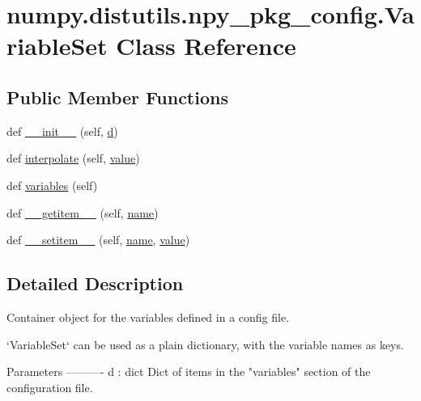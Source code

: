 \hypertarget{classnumpy_1_1distutils_1_1npy__pkg__config_1_1VariableSet}{}\section{numpy.\+distutils.\+npy\+\_\+pkg\+\_\+config.\+Variable\+Set Class Reference}
\label{classnumpy_1_1distutils_1_1npy__pkg__config_1_1VariableSet}
\subsection*{Public Member Functions}
\begin{DoxyCompactItemize}
\item 
def \hyperlink{classnumpy_1_1distutils_1_1npy__pkg__config_1_1VariableSet_af8b09c5ea33ed89e5723a93aa8b628d2}{\+\_\+\+\_\+init\+\_\+\+\_\+} (self, \hyperlink{namespacenumpy_1_1distutils_1_1npy__pkg__config_a70a37a3117c09425d291198550beef04}{d})
\item 
def \hyperlink{classnumpy_1_1distutils_1_1npy__pkg__config_1_1VariableSet_a37f81f39d26a1d5715c5dffee8dee581}{interpolate} (self, \hyperlink{namespacenumpy_1_1distutils_1_1npy__pkg__config_a8045441b5666dac1dfb0b4af13025f04}{value})
\item 
def \hyperlink{classnumpy_1_1distutils_1_1npy__pkg__config_1_1VariableSet_aebed4291aedbefe4b07a0612d968153b}{variables} (self)
\item 
def \hyperlink{classnumpy_1_1distutils_1_1npy__pkg__config_1_1VariableSet_a9a96984b723d4e6dcade692eb6ed423c}{\+\_\+\+\_\+getitem\+\_\+\+\_\+} (self, \hyperlink{namespacenumpy_1_1distutils_1_1npy__pkg__config_a6034536c2a07f9df487ae6aa59393339}{name})
\item 
def \hyperlink{classnumpy_1_1distutils_1_1npy__pkg__config_1_1VariableSet_a9cd410f93e2deeab0c5bcadfcf44877f}{\+\_\+\+\_\+setitem\+\_\+\+\_\+} (self, \hyperlink{namespacenumpy_1_1distutils_1_1npy__pkg__config_a6034536c2a07f9df487ae6aa59393339}{name}, \hyperlink{namespacenumpy_1_1distutils_1_1npy__pkg__config_a8045441b5666dac1dfb0b4af13025f04}{value})
\end{DoxyCompactItemize}


\subsection{Detailed Description}
\begin{DoxyVerb}Container object for the variables defined in a config file.

`VariableSet` can be used as a plain dictionary, with the variable names
as keys.

Parameters
----------
d : dict
    Dict of items in the "variables" section of the configuration file.\end{DoxyVerb}
 

